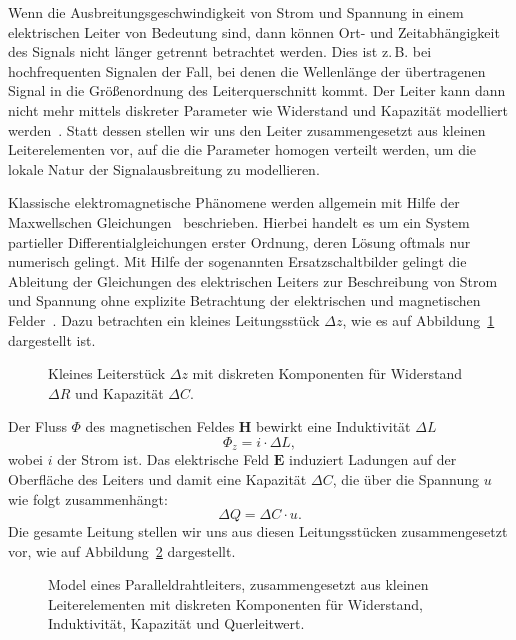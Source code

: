 \documentclass[paper=a4, parskip=half-, ngerman, fontsize=11pt]{scrreprt}
\begin{document}
Wenn die Ausbreitungsgeschwindigkeit von Strom und Spannung in einem elektrischen Leiter von Bedeutung sind, dann
können Ort- und Zeitabhängigkeit des Signals nicht länger getrennt betrachtet werden. Dies ist z.\,B. bei
hochfrequenten Signalen der Fall, bei denen die Wellenlänge der übertragenen Signal in die Größenordnung des
Leiterquerschnitt kommt. Der Leiter kann dann nicht mehr mittels diskreter Parameter wie Widerstand und Kapazität
modelliert werden~\cite{LeiterTheorie}. Statt dessen stellen wir uns den Leiter zusammengesetzt aus kleinen
Leiterelementen vor, auf die die Parameter homogen verteilt werden, um die lokale Natur der Signalausbreitung zu
modellieren.

Klassische elektromagnetische Phänomene werden allgemein mit Hilfe der Maxwellschen
Gleichungen~\cite{MaxwellGleichungen} beschrieben. Hierbei handelt es um ein System partieller Differentialgleichungen
erster Ordnung, deren Lösung oftmals nur numerisch gelingt. Mit Hilfe der sogenannten Ersatzschaltbilder gelingt die
Ableitung der Gleichungen des elektrischen Leiters zur Beschreibung von Strom und Spannung ohne explizite Betrachtung
der elektrischen und magnetischen Felder~\cite{LeitungenUndFilter}. Dazu betrachten ein kleines Leitungsstück $\Delta
z$, wie es auf Abbildung~\ref{Leitung1} dargestellt ist.
\begin{figure}[!htb]
    \begin{center}
        
        \caption{Kleines Leiterstück $\Delta z$ mit diskreten Komponenten für Widerstand $\Delta R$ und
        Kapazität $\Delta C$.}
        \label{Leitung1}
    \end{center}
\end{figure}

Der Fluss $\Phi$ des magnetischen Feldes $\textbf{H}$ bewirkt eine Induktivität $\Delta L$
\[ \Phi_{z} = i \cdot \Delta L, \] wobei $i$ der Strom ist.
Das elektrische Feld $\textbf{E}$ induziert Ladungen auf der Oberfläche des Leiters und damit eine Kapazität $\Delta C$,
die über die Spannung $u$ wie folgt zusammenhängt:
\[ \Delta Q = \Delta C \cdot u . \]
Die gesamte Leitung stellen wir uns aus diesen Leitungsstücken zusammengesetzt vor, wie auf Abbildung~\ref{Leitung2}
dargestellt.
\begin{figure}[!htb]
    \begin{center}
        
        \caption{Model eines Paralleldrahtleiters, zusammengesetzt aus kleinen Leiterelementen mit diskreten
        Komponenten für Widerstand, Induktivität, Kapazität und Querleitwert.}
        \label{Leitung2}
    \end{center}
\end{figure}
\end{document}
